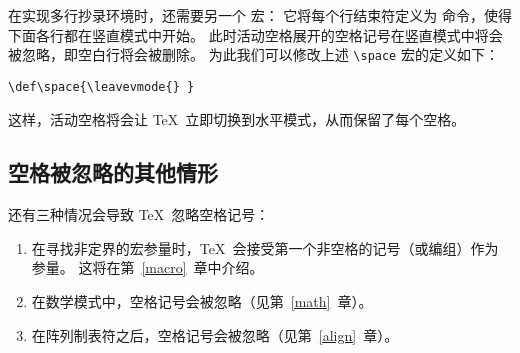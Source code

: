\documentclass{book}
\begin{document}
在实现多行抄录环境时，还需要另一个  宏：
它将每个行结束符定义为  命令，使得下面各行都在竖直模式中开始。
此时活动空格展开的空格记号在竖直模式中将会被忽略，即空白行将会被删除。
为此我们可以修改上述 \verb>\space> 宏的定义如下：
\begin{verbatim}
\def\space{\leavevmode{} }
\end{verbatim}
这样，活动空格将会让 \TeX\ 立即切换到水平模式，从而保留了每个空格。

\subsection{空格被忽略的其他情形}

还有三种情况会导致 \TeX\ 忽略空格记号：
\alt
\begin{enumerate}
\item 在寻找非定界的宏参量时，\TeX\ 会接受第一个非空格的记号（或编组）作为参量。
这将在第~\ref{macro}~章中介绍。

\item 在数学模式中，空格记号会被忽略（见第~\ref{math}~章）。

\item 在阵列制表符之后，空格记号会被忽略（见第~\ref{align}~章）。
\end{enumerate}
\end{document}
